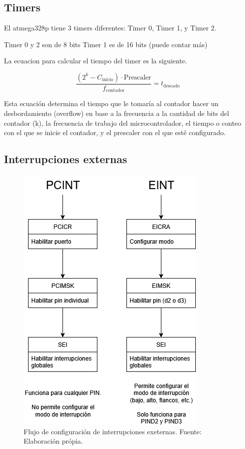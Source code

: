\subsection{Timers}
El atmega328p tiene 3 timers diferentes: Timer 0, Timer 1, y Timer 2.

Timer 0 y 2 son de 8 bits
Timer 1 es de 16 bits (puede contar más)

La ecuacion para calcular el tiempo del timer es la siguiente.

\begin{equation}
    \frac{(2^{k} - C_{\text{inicio}})\cdot \text{Prescaler}}{f_{\text{contador}}} = t_{\text{deseado}}
\end{equation}

Esta ecuación determina el tiempo que le tomaría al contador hacer un desbordamiento (overflow) en base a la frecuencia a la cantidad de bits del contador (k), la frecuencia de trabajo del microcontrolador, el tiempo o conteo con el que se inicie el contador, y el prescaler con el que esté configurado. 

\subsection{Interrupciones externas}

   \begin{figure}[H]
    \centering
    \includegraphics[width=0.7\linewidth]{./Anexos/Marco Teorico/External Interrupts/Interrupt diagram.png}
    \caption{Flujo de configuración de interrupciones exeternas. Fuente: Elaboración própia.}
    \label{fig:InterruptDiagram}
    \end{figure}


